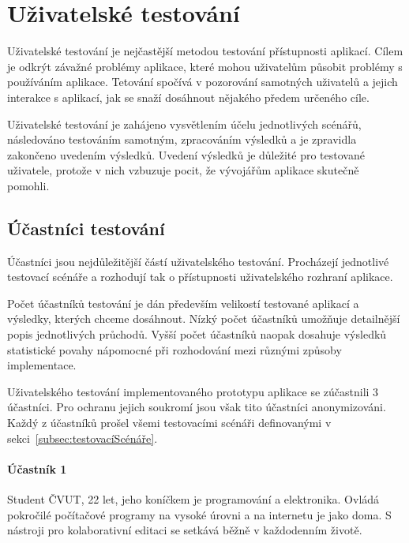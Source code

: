 
\section{Uživatelské testování}\label{sec:uživatelskéTestování}

Uživatelské testování je nejčastější metodou testování přístupnosti aplikací.
Cílem je odkrýt závažné problémy aplikace, které mohou uživatelům působit problémy s používáním aplikace.
Tetování spočívá v pozorování samotných uživatelů a jejich interakce s aplikací, jak se snaží dosáhnout nějakého předem určeného cíle.

Uživatelské testování je zahájeno vysvětlením účelu jednotlivých scénářů, následováno testováním samotným, zpracováním výsledků a je zpravidla zakončeno uvedením výsledků.
Uvedení výsledků je důležité pro testované uživatele, protože v nich vzbuzuje pocit, že vývojářům aplikace skutečně pomohli.~\cite{book:userTesting}



\subsection{Účastníci testování}\label{subsec:účastníciTestování}

Účastníci jsou nejdůležitější částí uživatelského testování.
Procházejí jednotlivé testovací scénáře a rozhodují tak o přístupnosti uživatelského rozhraní aplikace.

Počet účastníků testování je dán především velikostí testované aplikací a výsledky, kterých chceme dosáhnout.
Nízký počet účastníků umožňuje detailnější popis jednotlivých průchodů.
Vyšší počet účastníků naopak dosahuje výsledků statistické povahy nápomocné při rozhodování mezi různými způsoby implementace.

Uživatelského testování implementovaného prototypu aplikace se zúčastnili 3 účastníci.
Pro ochranu jejich soukromí jsou však tito účastníci anonymizováni.
Každý z účastníků prošel všemi testovacími scénáři definovanými v sekci~\ref{subsec:testovacíScénáře}.

\paragraph{Účastník 1}
Student \acrshort{ČVUT}, 22 let, jeho koníčkem je programování a elektronika.
Ovládá pokročilé počítačové programy na vysoké úrovni a na internetu je jako doma.
S nástroji pro kolaborativní editaci se setkává běžně v každodenním životě.

